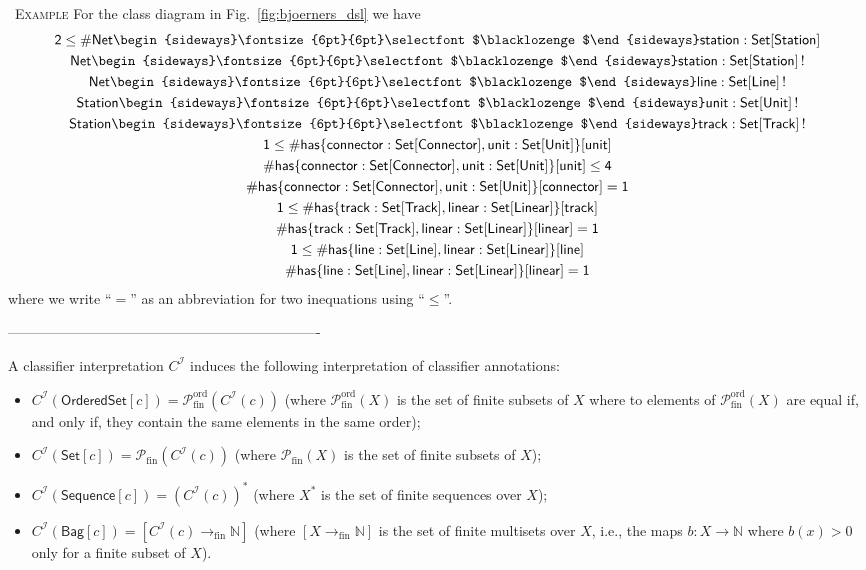 \documentclass[10pt,fleqn,%
\ifpretendfinal
final%
\else
draft%
\fi,
]{scrreprt}
\newcommand{\finorderedpowerset}{\mathcal{P}^{\mathrm{ord}}_{\mathrm{fin}}}
\newcommand{\finpowerset}{\mathcal{P}_{\mathrm{fin}}}
\newenvironment{example}[0]{\ \newline \textsc{Example}\quad }{}
\newcommand{\composition}{\raisebox{0.2pt}{\begin{sideways}\fontsize{6pt}{6pt}\selectfont$\blacklozenge$\end{sideways}}}
\begin{document}
\begin{example}
For the class diagram in Fig.~\ref{fig:bjoerners_dsl} we have
\begin{gather*}
  \mathsf{2 \leq \#Net\composition station : Set[Station]}
\\
  \mathsf{Net\composition station : Set[Station]\,!}
\\
  \mathsf{Net\composition line : Set[Line]\,!}
\\
  \mathsf{Station\composition unit : Set[Unit]\,!}
\\
  \mathsf{Station\composition track : Set[Track]\,!}
\\
  \mathsf{1 \leq \#has\{ connector : Set[Connector], unit : Set[Unit] \}[unit]}
\\
  \mathsf{\#has\{ connector : Set[Connector], unit : Set[Unit] \}[unit] \leq 4}
\\
  \mathsf{\#has\{ connector : Set[Connector], unit : Set[Unit] \}[connector] = 1}
\\
  \mathsf{1 \leq \#has\{ track : Set[Track], linear : Set[Linear] \}[track]}
\\
  \mathsf{\#has\{ track : Set[Track], linear : Set[Linear] \}[linear] = 1}
\\
  \mathsf{1 \leq \#has\{ line : Set[Line], linear : Set[Linear] \}[line]}
\\
  \mathsf{\#has\{ line : Set[Line], linear : Set[Linear] \}[linear] = 1}
\end{gather*}
%
where we write ``$=$'' as an abbreviation for two inequations using
``$\leq$''.
\end{example}


-------------------------------------------------------------------



A classifier interpretation $C^{\mathcal{I}}$ induces the following
interpretation of classifier annotations:
%
\begin{itemize}[label={--}, leftmargin=*]
  \item
$C^{\mathcal{I}}(\mathsf{OrderedSet}[c]) =
\finorderedpowerset(C^{\mathcal{I}}(c))$
(where $\finorderedpowerset(X)$ is the set of finite subsets of $X$ where
to elements of $\finorderedpowerset(X)$ are equal if, and only if, they
contain the same elements in the same order);

  \item $C^{\mathcal{I}}(\mathsf{Set}[c]) =
\finpowerset(C^{\mathcal{I}}(c))$ (where $\finpowerset(X)$ is the set of
finite subsets of $X$);

  \item $C^{\mathcal{I}}(\mathsf{Sequence}[c]) = (C^{\mathcal{I}}(c))^*$
(where $X^*$ is the set of finite sequences over $X$);

  \item
$C^{\mathcal{I}}(\mathsf{Bag}[c]) = [C^{\mathcal{I}}(c)
\to_{\mathrm{fin}} \mathbb{N}]$
(where $[X \to_{\mathrm{fin}} \mathbb{N}]$ is the set of finite
multisets over $X$, i.e., the maps $b : X \to \mathbb{N}$ where
$b(x) > 0$ only for a finite subset of $X$).
\end{itemize}
\end{document}

